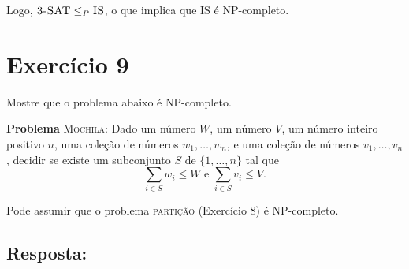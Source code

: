 \documentclass{article}
\begin{document}
\bigskip

Logo, $\textsc{3-SAT} \leq_P \textsc{IS}$, o que implica que \textsc{IS} é NP-completo.

\newpage

\section*{Exercício 9}
Mostre que o problema abaixo é NP-completo.
\begin{center}
  \begin{minipage}{33em}
    \textbf{Problema} \textsc{Mochila:} Dado um número $W$, um número $V$, um número inteiro positivo $n$, uma coleção de números $w_1, \dots, w_n$, e uma coleção de números $v_1, \dots, v_n$, decidir se existe um subconjunto $S$ de $\{1, \dots, n\}$ tal que
    \[\sum_{i \in S}w_i \leq W \mbox{ e } \sum_{i \in S}v_i \leq V .\]
  \end{minipage}
\end{center}
Pode assumir que o problema \textsc{partição} (Exercício 8) é NP-completo.

\bigskip

\subsection*{Resposta:}
\end{document}
